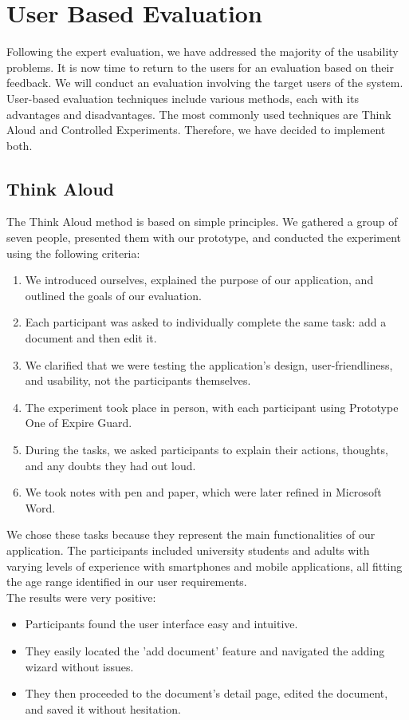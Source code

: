 \section{User Based Evaluation}
Following the expert evaluation, we have addressed the majority of the usability problems. It is now time to return to the users for an evaluation based on their feedback. We will conduct an evaluation involving the target users of the system. User-based evaluation techniques include various methods, each with its advantages and disadvantages. The most commonly used techniques are Think Aloud and Controlled Experiments. Therefore, we have decided to implement both.
	\subsection{Think Aloud}
	The Think Aloud method is based on simple principles. We gathered a group of seven people, presented them with our prototype, and conducted the experiment using the following criteria:
	\begin{enumerate}
		\item We introduced ourselves, explained the purpose of our application, and outlined the goals of our evaluation.
		\item Each participant was asked to individually complete the same task: add a document and then edit it.
		\item We clarified that we were testing the application’s design, user-friendliness, and usability, not the participants themselves.
		\item The experiment took place in person, with each participant using Prototype One of Expire Guard.
		\item During the tasks, we asked participants to explain their actions, thoughts, and any doubts they had out loud.
		\item We took notes with pen and paper, which were later refined in Microsoft Word.
	\end{enumerate}
	\noindent
	We chose these tasks because they represent the main functionalities of our application. The participants included university students and adults with varying levels of experience with smartphones and mobile applications, all fitting the age range identified in our user requirements.\\
	The results were very positive:
	\begin{itemize}
		\item Participants found the user interface easy and intuitive.
		\item They easily located the 'add document' feature and navigated the adding wizard without issues.
		\item They then proceeded to the document's detail page, edited the document, and saved it without hesitation.
	\end{itemize}
